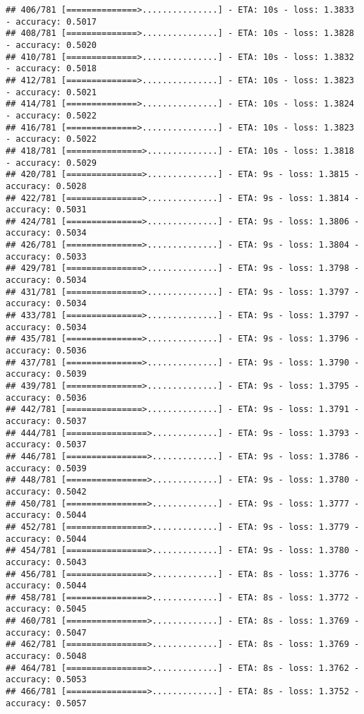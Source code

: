 \documentclass[
]{article}
\begin{document}
\begin{verbatim}
## 406/781 [==============>...............] - ETA: 10s - loss: 1.3833 - accuracy: 0.5017
## 408/781 [==============>...............] - ETA: 10s - loss: 1.3828 - accuracy: 0.5020
## 410/781 [==============>...............] - ETA: 10s - loss: 1.3832 - accuracy: 0.5018
## 412/781 [==============>...............] - ETA: 10s - loss: 1.3823 - accuracy: 0.5021
## 414/781 [==============>...............] - ETA: 10s - loss: 1.3824 - accuracy: 0.5022
## 416/781 [==============>...............] - ETA: 10s - loss: 1.3823 - accuracy: 0.5022
## 418/781 [===============>..............] - ETA: 10s - loss: 1.3818 - accuracy: 0.5029
## 420/781 [===============>..............] - ETA: 9s - loss: 1.3815 - accuracy: 0.5028 
## 422/781 [===============>..............] - ETA: 9s - loss: 1.3814 - accuracy: 0.5031
## 424/781 [===============>..............] - ETA: 9s - loss: 1.3806 - accuracy: 0.5034
## 426/781 [===============>..............] - ETA: 9s - loss: 1.3804 - accuracy: 0.5033
## 429/781 [===============>..............] - ETA: 9s - loss: 1.3798 - accuracy: 0.5034
## 431/781 [===============>..............] - ETA: 9s - loss: 1.3797 - accuracy: 0.5034
## 433/781 [===============>..............] - ETA: 9s - loss: 1.3797 - accuracy: 0.5034
## 435/781 [===============>..............] - ETA: 9s - loss: 1.3796 - accuracy: 0.5036
## 437/781 [===============>..............] - ETA: 9s - loss: 1.3790 - accuracy: 0.5039
## 439/781 [===============>..............] - ETA: 9s - loss: 1.3795 - accuracy: 0.5036
## 442/781 [===============>..............] - ETA: 9s - loss: 1.3791 - accuracy: 0.5037
## 444/781 [================>.............] - ETA: 9s - loss: 1.3793 - accuracy: 0.5037
## 446/781 [================>.............] - ETA: 9s - loss: 1.3786 - accuracy: 0.5039
## 448/781 [================>.............] - ETA: 9s - loss: 1.3780 - accuracy: 0.5042
## 450/781 [================>.............] - ETA: 9s - loss: 1.3777 - accuracy: 0.5044
## 452/781 [================>.............] - ETA: 9s - loss: 1.3779 - accuracy: 0.5044
## 454/781 [================>.............] - ETA: 9s - loss: 1.3780 - accuracy: 0.5043
## 456/781 [================>.............] - ETA: 8s - loss: 1.3776 - accuracy: 0.5044
## 458/781 [================>.............] - ETA: 8s - loss: 1.3772 - accuracy: 0.5045
## 460/781 [================>.............] - ETA: 8s - loss: 1.3769 - accuracy: 0.5047
## 462/781 [================>.............] - ETA: 8s - loss: 1.3769 - accuracy: 0.5048
## 464/781 [================>.............] - ETA: 8s - loss: 1.3762 - accuracy: 0.5053
## 466/781 [================>.............] - ETA: 8s - loss: 1.3752 - accuracy: 0.5057

\end{verbatim}
\end{document}
